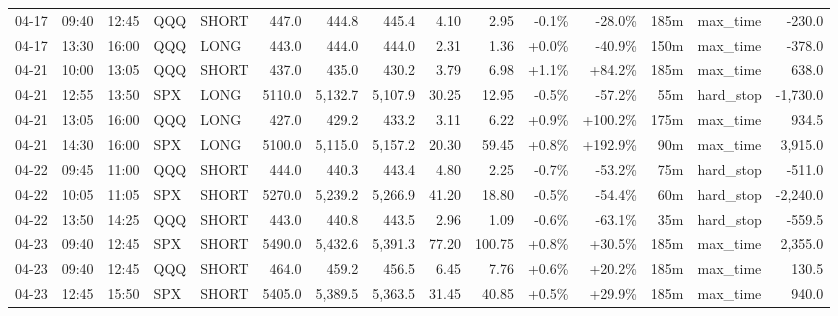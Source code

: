 \documentclass[11pt,a4paper,twoside]{article}
\begin{document}
\begin{landscape}
\begin{center}
\begin{longtable}{>{\color{txtmain}}l l l l l r r r r r r r r >{\color{txtmain}}l r}
04-17 & 09:40 & 12:45 & QQQ & SHORT & 447.0 & 444.8 & 445.4 & 4.10 & 2.95 & \textcolor{lossred}{-0.1\%} & \textcolor{lossred}{-28.0\%} & 185m & max\_time & \textcolor{lossred}{-230.0} \\
04-17 & 13:30 & 16:00 & QQQ & LONG & 443.0 & 444.0 & 444.0 & 2.31 & 1.36 & \textcolor{wingreen}{+0.0\%} & \textcolor{lossred}{-40.9\%} & 150m & max\_time & \textcolor{lossred}{-378.0} \\
04-21 & 10:00 & 13:05 & QQQ & SHORT & 437.0 & 435.0 & 430.2 & 3.79 & 6.98 & \textcolor{wingreen}{+1.1\%} & \textcolor{wingreen}{+84.2\%} & 185m & max\_time & \textcolor{wingreen}{638.0} \\
04-21 & 12:55 & 13:50 & SPX & LONG & 5110.0 & 5,132.7 & 5,107.9 & 30.25 & 12.95 & \textcolor{lossred}{-0.5\%} & \textcolor{lossred}{-57.2\%} & 55m & hard\_stop & \textcolor{lossred}{-1,730.0} \\
04-21 & 13:05 & 16:00 & QQQ & LONG & 427.0 & 429.2 & 433.2 & 3.11 & 6.22 & \textcolor{wingreen}{+0.9\%} & \textcolor{wingreen}{+100.2\%} & 175m & max\_time & \textcolor{wingreen}{934.5} \\
04-21 & 14:30 & 16:00 & SPX & LONG & 5100.0 & 5,115.0 & 5,157.2 & 20.30 & 59.45 & \textcolor{wingreen}{+0.8\%} & \textcolor{wingreen}{+192.9\%} & 90m & max\_time & \textcolor{wingreen}{3,915.0} \\
04-22 & 09:45 & 11:00 & QQQ & SHORT & 444.0 & 440.3 & 443.4 & 4.80 & 2.25 & \textcolor{lossred}{-0.7\%} & \textcolor{lossred}{-53.2\%} & 75m & hard\_stop & \textcolor{lossred}{-511.0} \\
04-22 & 10:05 & 11:05 & SPX & SHORT & 5270.0 & 5,239.2 & 5,266.9 & 41.20 & 18.80 & \textcolor{lossred}{-0.5\%} & \textcolor{lossred}{-54.4\%} & 60m & hard\_stop & \textcolor{lossred}{-2,240.0} \\
04-22 & 13:50 & 14:25 & QQQ & SHORT & 443.0 & 440.8 & 443.5 & 2.96 & 1.09 & \textcolor{lossred}{-0.6\%} & \textcolor{lossred}{-63.1\%} & 35m & hard\_stop & \textcolor{lossred}{-559.5} \\
04-23 & 09:40 & 12:45 & SPX & SHORT & 5490.0 & 5,432.6 & 5,391.3 & 77.20 & 100.75 & \textcolor{wingreen}{+0.8\%} & \textcolor{wingreen}{+30.5\%} & 185m & max\_time & \textcolor{wingreen}{2,355.0} \\
04-23 & 09:40 & 12:45 & QQQ & SHORT & 464.0 & 459.2 & 456.5 & 6.45 & 7.76 & \textcolor{wingreen}{+0.6\%} & \textcolor{wingreen}{+20.2\%} & 185m & max\_time & \textcolor{wingreen}{130.5} \\
04-23 & 12:45 & 15:50 & SPX & SHORT & 5405.0 & 5,389.5 & 5,363.5 & 31.45 & 40.85 & \textcolor{wingreen}{+0.5\%} & \textcolor{wingreen}{+29.9\%} & 185m & max\_time & \textcolor{wingreen}{940.0} \\

\end{longtable}
\end{center}
\end{landscape}
\end{document}
